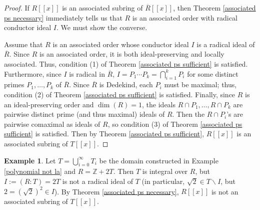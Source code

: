 \documentclass[12pt]{amsart}
\theoremstyle{definition}
\newtheorem{example}[theorem]{Example}
\newcommand{\bZ}{\mathbb Z}
\newcommand{\Rbar}{{\overline{R}}}
\begin{document}
\begin{proof}
    If $R[[x]]$ is an associated subring of $\Rbar[[x]]$, then Theorem \ref{associated ps necessary} immediately tells us that $R$ is an associated order with radical conductor ideal $I$. We must show the converse.

    Assume that $R$ is an associated order whose conductor ideal $I$ is a radical ideal of $\Rbar$. Since $R$ is an associated order, it is both ideal-preserving and locally associated. Thus, condition (1) of Theorem \ref{associated ps sufficient} is satisfied. Furthermore, since $I$ is radical in $\Rbar$, $I=P_1\cdots P_k=\bigcap_{i=1}^kP_i$ for some distinct primes $P_1,\dots,P_k$ of $\Rbar$. Since $\Rbar$ is Dedekind, each $P_i$ must be maximal; thus, condition (2) of Theorem \ref{associated ps sufficient} is satisfied. Finally, since $R$ is an ideal-preserving order and $\dim(R)=1$, the ideals $R\cap P_1,\dots,R\cap P_k$ are pairwise distinct prime (and thus maximal) ideals of $R$. Then the $R\cap P_i$'s are pairwise comaximal as ideals of $R$, so condition (3) of Theorem \ref{associated ps sufficient} is satisfied. Then by Theorem \ref{associated ps sufficient}, $R[[x]]$ is an associated subring of $T[[x]]$.
\end{proof}

\begin{example}
    \label{ps not associated}
    Let $T=\bigcup_{i=0}^\infty T_i$ be the domain constructed in Example \ref{polynomial not la} and $R=\bZ+2T$. Then $T$ is integral over $R$, but $I:=(R:T)=2T$ is not a radical ideal of $T$ (in particular, $\sqrt{2}\in T\backslash I$, but $2=(\sqrt{2})^2\in I$). By Theorem \ref{associated ps necessary}, $R[[x]]$ is not an associated subring of $T[[x]]$.
\end{example}
\end{document}
